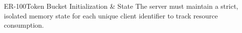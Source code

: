 \begin{equipmentrequirement}{ER-100}{Token Bucket Initialization \& State}
    The server must maintain a strict, isolated memory state for each unique client identifier to track resource consumption.
\end{equipmentrequirement}